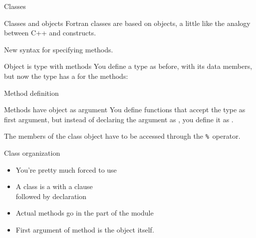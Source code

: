 
 {Classes}
\label{sec:objectf}

\begin{block}{Classes and objects}
  \label{sl:fclass}
Fortran classes are based on  objects, a little like the
analogy between C++  and  constructs.

New syntax for specifying methods.
\end{block}

\begin{block}{Object is type with methods}
  \label{sl:fclass-prog}
  You define a type as before, with its data members, but now the type
  has a  for the
  methods:
  \footnotesize
  \begin{multicols}{2}
  \end{multicols}
\end{block}

\begin{block}{Method definition}
  \label{sl:fclass-method}
\end{block}

\begin{block}{Methods have object as argument}
  \label{sl:fclass-self}
  You define functions that accept the type as first argument, but
  instead of declaring the argument as , you define it as
  .

  The members of the class object have to be accessed through the
  \verb+%+~operator.
\end{block}

\begin{block}{Class organization}
  \label{sl:fclass-org}
  \begin{itemize}
  \item You're pretty much forced to use 
  \item A class is a  with a  clause\\
    followed by  declaration
  \item Actual methods go in the  part of the module
  \item First argument of method is the object itself.
  \end{itemize}
\end{block}

